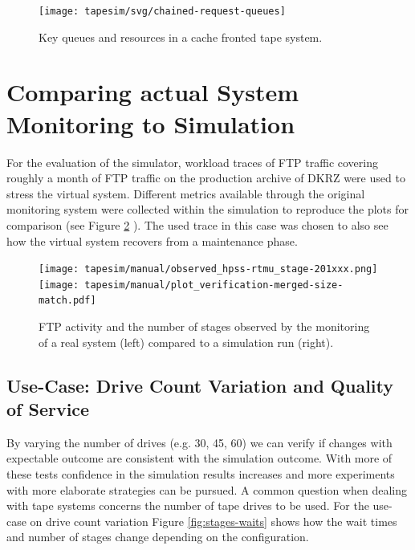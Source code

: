 \documentclass{../../template/esiwace-report}
\begin{document}
\begin{figure} [h]
	\centering
	\texttt{[image: tapesim/svg/chained-request-queues]}
	\caption{Key queues and resources in a cache fronted tape system.}
	\label{fig:chained request queues}
\end{figure}


\section{Comparing actual System Monitoring to Simulation}


For the evaluation of the simulator, workload traces of FTP traffic covering
roughly a month of FTP traffic on the production archive of DKRZ were used
to stress the virtual system. Different metrics available through the original
monitoring system were collected within the simulation to reproduce the plots
for comparison (see Figure \ref{fig:monitoring-real}
).
The used trace in this case was chosen to also see how the virtual system recovers
from a maintenance phase.


\begin{figure}
	\texttt{[image: tapesim/manual/observed\_hpss-rtmu\_stage-201xxx.png]}
	\texttt{[image: tapesim/manual/plot\_verification-merged-size-match.pdf]}
	\caption{FTP activity and the number of stages observed by the monitoring of a real system (left) compared to a simulation run (right).}
	\label{fig:monitoring-real}
\end{figure}


\subsection{Use-Case: Drive Count Variation and Quality of Service}

By varying the number of drives (e.g. 30, 45, 60) we can verify if changes with
expectable outcome are consistent with the simulation outcome. With more of
these tests confidence in the simulation results increases and more experiments
with more elaborate strategies can be pursued.
A common question when dealing with tape systems concerns the number of tape
drives to be used. For the use-case on drive count variation Figure \ref{fig:stages-waits}
shows how the wait times and number of stages change depending on the configuration.
\end{document}
